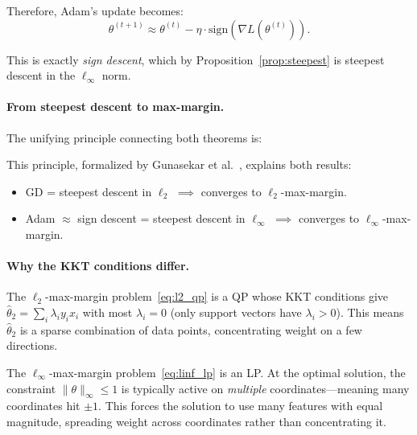 \documentclass{article}
\begin{document}
Therefore, Adam's update becomes:
\begin{equation}
    \theta^{(t+1)} \approx \theta^{(t)} - \eta \cdot \text{sign}(\nabla L(\theta^{(t)})).
    \label{eq:sign_descent}
\end{equation}

This is exactly \emph{sign descent}, which by Proposition~\ref{prop:steepest} is steepest descent in the $\ell_\infty$ norm.

\paragraph{From steepest descent to max-margin.} The unifying principle connecting both theorems is:

\begin{center}
\end{center}

This principle, formalized by Gunasekar et al.~\cite{gunasekar2018}, explains both results:
\begin{itemize}[leftmargin=*]
    \item GD = steepest descent in $\ell_2$ $\implies$ converges to $\ell_2$-max-margin.
    \item Adam $\approx$ sign descent = steepest descent in $\ell_\infty$ $\implies$ converges to $\ell_\infty$-max-margin.
\end{itemize}

\paragraph{Why the KKT conditions differ.} The $\ell_2$-max-margin problem~\eqref{eq:l2_qp} is a QP whose KKT conditions give $\hat{\theta}_2 = \sum_i \lambda_i y_i x_i$ with most $\lambda_i = 0$ (only support vectors have $\lambda_i > 0$). This means $\hat{\theta}_2$ is a sparse combination of data points, concentrating weight on a few directions.

The $\ell_\infty$-max-margin problem~\eqref{eq:linf_lp} is an LP. At the optimal solution, the constraint $\|\theta\|_\infty \leq 1$ is typically active on \emph{multiple} coordinates---meaning many coordinates hit $\pm 1$. This forces the solution to use many features with equal magnitude, spreading weight across coordinates rather than concentrating it.
\end{document}

